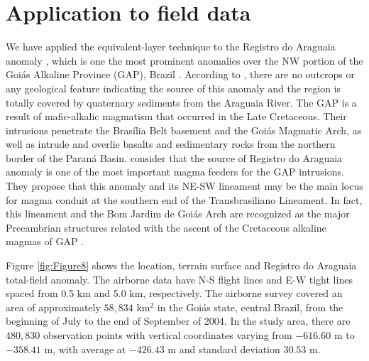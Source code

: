 \section{Application to field data}
\label{eq:field_data}

We have applied the equivalent-layer technique to the Registro do Araguaia anomaly 
\citep{dutra_etal_2012, marangoni_mantovani_2013, dutra_etal_2014}, which is one the most 
prominent anomalies over the NW portion of the Goiás Alkaline Province (GAP), Brazil 
\citep{junqueira-brod_etal_2005}. 
According to \citet{dutra_etal_2012}, there are no outcrops or any geological feature 
indicating the source of this anomaly and the region is totally covered by quaternary 
sediments from the Araguaia River.
The GAP is a result of maﬁc-alkalic magmatism that occurred in the Late Cretaceous. Their 
intrusions penetrate the Bras{\'i}lia Belt basement and the Goi{\'a}s Magmatic Arch, as well 
as intrude and overlie basalts and sedimentary rocks from the northern border of the 
Paran{\'a} Basin.
\citet{dutra_etal_2014} consider that the source of Registro do Araguaia anomaly is one of the 
most important magma feeders for the GAP intrusions. 
They propose that this anomaly and its NE-SW lineament may be the main locus for magma conduit 
at the southern end of the Transbrasiliano Lineament.
In fact, this lineament and the Bom Jardim de Goiás Arch are recognized as the major 
Precambrian structures related with the ascent of the Cretaceous alkaline magmas of GAP 
\citep[][ p. 263]{brod_etal2005}.

Figure \ref{fig:Figure8} shows the location, terrain surface and Registro do Araguaia 
total-field anomaly.
The airborne data have N-S flight lines and E-W tight lines spaced from 0.5 km and 5.0 km, 
respectively. 
The airborne survey covered an area of approximately $58,834$ km$^{2}$ in the Goiás state, 
central Brazil, from the beginning of July to the end of September of 2004. 
In the study area, there are $480,830$ observation points with vertical coordinates varying 
from $-616.60$ m to $-358.41$ m, with average at $-426.43$ m and standard deviation $30.53$ m.

